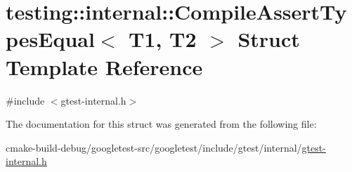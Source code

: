 \hypertarget{structtesting_1_1internal_1_1CompileAssertTypesEqual}{}\section{testing\+::internal\+::Compile\+Assert\+Types\+Equal$<$ T1, T2 $>$ Struct Template Reference}
\label{structtesting_1_1internal_1_1CompileAssertTypesEqual}


{\ttfamily \#include $<$gtest-\/internal.\+h$>$}



The documentation for this struct was generated from the following file\+:\begin{DoxyCompactItemize}
\item 
cmake-\/build-\/debug/googletest-\/src/googletest/include/gtest/internal/\mbox{\hyperlink{gtest-internal_8h}{gtest-\/internal.\+h}}\end{DoxyCompactItemize}
